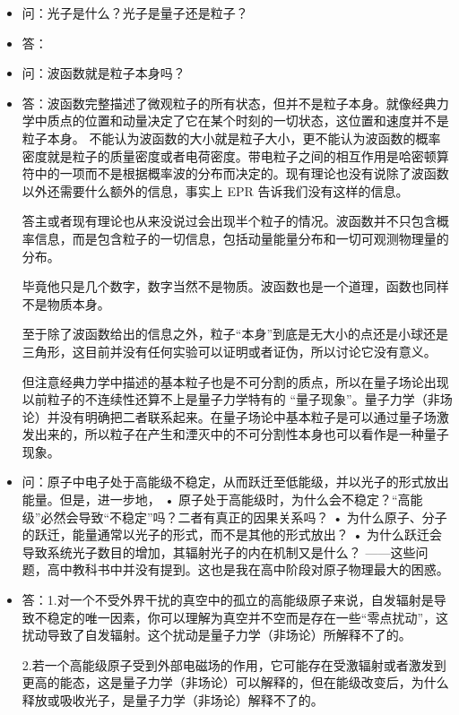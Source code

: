 \begin{itemize}
\item 问：光子是什么？光子是量子还是粒子？
\item 答：

\item 问：波函数就是粒子本身吗？
\item 答：波函数完整描述了微观粒子的所有状态，但并不是粒子本身。就像经典力学中质点的位置和动量决定了它在某个时刻的一切状态，这位置和速度并不是粒子本身。 不能认为波函数的大小就是粒子大小，更不能认为波函数的概率密度就是粒子的质量密度或者电荷密度。带电粒子之间的相互作用是哈密顿算符中的一项而不是根据概率波的分布而决定的。现有理论也没有说除了波函数以外还需要什么额外的信息，事实上 EPR 告诉我们没有这样的信息。

\ite

答主或者现有理论也从来没说过会出现半个粒子的情况。波函数并不只包含概率信息，而是包含粒子的一切信息，包括动量能量分布和一切可观测物理量的分布。

毕竟他只是几个数字，数字当然不是物质。波函数也是一个道理，函数也同样不是物质本身。

至于除了波函数给出的信息之外，粒子“本身”到底是无大小的点还是小球还是三角形，这目前并没有任何实验可以证明或者证伪，所以讨论它没有意义。

但注意经典力学中描述的基本粒子也是不可分割的质点，所以在量子场论出现以前粒子的不连续性还算不上是量子力学特有的 “量子现象”。量子力学（非场论）并没有明确把二者联系起来。在量子场论中基本粒子是可以通过量子场激发出来的，所以粒子在产生和湮灭中的不可分割性本身也可以看作是一种量子现象。

\item 问：原子中电子处于高能级不稳定，从而跃迁至低能级，并以光子的形式放出能量。但是，进一步地，
• 原子处于高能级时，为什么会不稳定？“高能级”必然会导致“不稳定”吗？二者有真正的因果关系吗？
• 为什么原子、分子的跃迁，能量通常以光子的形式，而不是其他的形式放出？
• 为什么跃迁会导致系统光子数目的增加，其辐射光子的内在机制又是什么？
——这些问题，高中教科书中并没有提到。这也是我在高中阶段对原子物理最大的困惑。
\item 答：1.对一个不受外界干扰的真空中的孤立的高能级原子来说，自发辐射是导致不稳定的唯一因素，你可以理解为真空并不空而是存在一些“零点扰动”，这扰动导致了自发辐射。这个扰动是量子力学（非场论）所解释不了的。

2.若一个高能级原子受到外部电磁场的作用，它可能存在受激辐射或者激发到更高的能态，这是量子力学（非场论）可以解释的，但在能级改变后，为什么释放或吸收光子，是量子力学（非场论）解释不了的。


\end{itemize}
